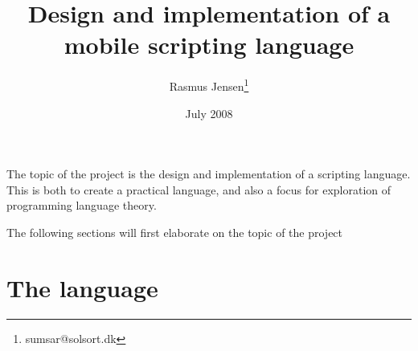 \documentclass[12pt]{article}
\title{Design and implementation of a mobile scripting language}
\author{
  Rasmus Jensen\footnote{
    sumsar@solsort.dk
  }
}
\date{July 2008}
\begin{document}
\maketitle






The topic of the project is the design and implementation of a scripting language.
This is both to create a practical language, 
and also a focus for exploration of programming language theory.

The following sections will first elaborate on the topic of the project

\section{The language}











\nocite{sicp}
\appendix




\end{document}
